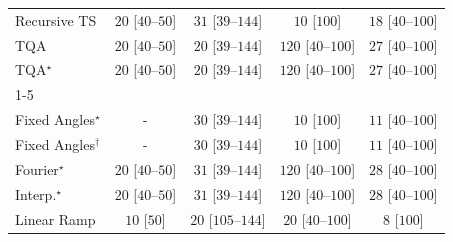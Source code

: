 \begin{tabular}{l|cccc|}
Recursive TS & {\cellcolor[HTML]{F5FBF2}} \color[HTML]{000000} $20$ [$40$--$50$] & {\cellcolor[HTML]{F3FAF0}} \color[HTML]{000000} $31$ [$39$--$144$] & {\cellcolor[HTML]{F7FCF5}} \color[HTML]{000000} $10$ [$100$] & {\cellcolor[HTML]{F5FBF3}} \color[HTML]{000000} $18$ [$40$--$100$] \\
TQA & {\cellcolor[HTML]{F5FBF2}} \color[HTML]{000000} $20$ [$40$--$50$] & {\cellcolor[HTML]{F5FBF2}} \color[HTML]{000000} $20$ [$39$--$144$] & {\cellcolor[HTML]{E0F3DB}} \color[HTML]{000000} $120$ [$40$--$100$] & {\cellcolor[HTML]{F4FBF1}} \color[HTML]{000000} $27$ [$40$--$100$] \\
TQA$^\star$ & {\cellcolor[HTML]{F5FBF2}} \color[HTML]{000000} $20$ [$40$--$50$] & {\cellcolor[HTML]{F5FBF2}} \color[HTML]{000000} $20$ [$39$--$144$] & {\cellcolor[HTML]{E0F3DB}} \color[HTML]{000000} $120$ [$40$--$100$] & {\cellcolor[HTML]{F4FBF1}} \color[HTML]{000000} $27$ [$40$--$100$] \\
\cline{1-5}
\multicolumn{5}{c}{\rule{0pt}{8pt}PP} \\
\midrule
Fixed Angles$^\star$ & {\cellcolor[HTML]{000000}} \color[HTML]{F1F1F1} {\cellcolor{white}} \color{black} - & {\cellcolor[HTML]{F3FAF0}} \color[HTML]{000000} $30$ [$39$--$144$] & {\cellcolor[HTML]{F7FCF5}} \color[HTML]{000000} $10$ [$100$] & {\cellcolor[HTML]{F6FCF4}} \color[HTML]{000000} $11$ [$40$--$100$] \\
Fixed Angles$^\dagger$ & {\cellcolor[HTML]{000000}} \color[HTML]{F1F1F1} {\cellcolor{white}} \color{black} - & {\cellcolor[HTML]{F3FAF0}} \color[HTML]{000000} $30$ [$39$--$144$] & {\cellcolor[HTML]{F7FCF5}} \color[HTML]{000000} $10$ [$100$] & {\cellcolor[HTML]{F6FCF4}} \color[HTML]{000000} $11$ [$40$--$100$] \\
Fourier$^\star$ & {\cellcolor[HTML]{F5FBF2}} \color[HTML]{000000} $20$ [$40$--$50$] & {\cellcolor[HTML]{F3FAF0}} \color[HTML]{000000} $31$ [$39$--$144$] & {\cellcolor[HTML]{E0F3DB}} \color[HTML]{000000} $120$ [$40$--$100$] & {\cellcolor[HTML]{F4FBF1}} \color[HTML]{000000} $28$ [$40$--$100$] \\
Interp.$^\star$ & {\cellcolor[HTML]{F5FBF2}} \color[HTML]{000000} $20$ [$40$--$50$] & {\cellcolor[HTML]{F3FAF0}} \color[HTML]{000000} $31$ [$39$--$144$] & {\cellcolor[HTML]{E0F3DB}} \color[HTML]{000000} $120$ [$40$--$100$] & {\cellcolor[HTML]{F4FBF1}} \color[HTML]{000000} $28$ [$40$--$100$] \\
Linear Ramp & {\cellcolor[HTML]{F7FCF5}} \color[HTML]{000000} $10$ [$50$] & {\cellcolor[HTML]{F5FBF2}} \color[HTML]{000000} $20$ [$105$--$144$] & {\cellcolor[HTML]{F5FBF2}} \color[HTML]{000000} $20$ [$40$--$100$] & {\cellcolor[HTML]{F7FCF5}} \color[HTML]{000000} $8$ [$100$] \\

\end{tabular}
